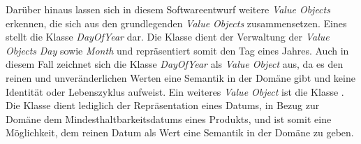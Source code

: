 Darüber hinaus lassen sich in diesem Softwareentwurf weitere \textit{Value Objects} erkennen, die sich aus den grundlegenden \textit{Value Objects} zusammensetzen.
Eines stellt die Klasse \href{}{\code{}}\textit{DayOfYear} dar.
Die Klasse dient der Verwaltung der \textit{Value Objects} \href{}{\code{}}\textit{Day} sowie \href{}{\code{}}\textit{Month} und repräsentiert somit den Tag eines Jahres.
Auch in diesem Fall zeichnet sich die Klasse \href{}{\code{}}\textit{DayOfYear} als \textit{Value Object} aus, da es den reinen und unveränderlichen Werten eine Semantik in der Domäne gibt und keine Identität oder Lebenszyklus aufweist.
Ein weiteres \textit{Value Object} ist die Klasse \href{}{}.
Die Klasse dient lediglich der Repräsentation eines Datums, in Bezug zur Domäne dem Mindesthaltbarkeitsdatums eines Produkts, und ist somit eine Möglichkeit, dem reinen Datum als Wert eine Semantik in der Domäne zu geben.


